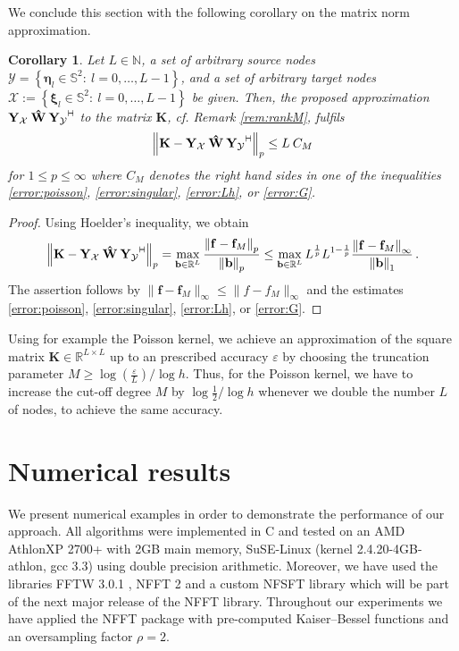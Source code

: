 \documentclass[11pt,a4paper,twoside,bibtotoc]{scrartcl}
\theoremstyle{plain}
\newtheorem{corollary}[theorem]{Corollary}
\theoremstyle{definition}
\theoremstyle{remark}
\newcommand{\N}{\ensuremath{\mathbb{N}}}
\newcommand{\R}{\ensuremath{\mathbb{R}}}
\newcommand{\adj}{{\vdash \hspace*{-1.72mm} \dashv}}
\numberwithin{equation}{section}
\numberwithin{table}{section}
\numberwithin{figure}{section}
\begin{document}
We conclude this section with the following corollary on the matrix norm
approximation.
\begin{corollary}
  \label{cor:rankapprox}
  Let $L \in \N$, a set of arbitrary source nodes $\mathcal{Y} =
  \left\{\mathbf{\eta}_{l} \in \mathbb{S}^2:\ l = 0,\ldots,L-1\right\}$, and a set of
  arbitrary target nodes $\mathcal{X} := \left\{\mathbf{\xi}_{l} \in
  \mathbb{S}^2:\ l=0,\ldots,L-1\right\}$ be given.
  Then, the proposed approximation $\mathbf{Y_{\mathcal{X}}} \: \mathbf{\hat W} \:
  \mathbf{Y_{\mathcal{Y}}}^{\adj}$ to the matrix $\mathbf{K}$, cf. Remark
  \ref{rem:rankM}, fulfils
  \begin{equation*}
    \left\| \mathbf{K} - \mathbf{Y_{\mathcal{X}}} \: \mathbf{\hat W} \:
      \mathbf{Y_{\mathcal{Y}}}^{\adj} \right\|_p
    \le L \: C_M
  \end{equation*}
  for $1\le p \le \infty$ where $C_M$ denotes the right hand sides in one of
  the inequalities \eqref{error:poisson}, \eqref{error:singular},
  \eqref{error:Lh}, or \eqref{error:G}. 
\end{corollary}
\begin{proof}
 Using Hoelder's inequality, we obtain
 \[
 \left\| \mathbf{K} - \mathbf{Y_{\mathcal{X}}} \: \mathbf{\hat W} \:
   \mathbf{Y_{\mathcal{Y}}}^{\adj} \right\|_p
 = \max_{\mathbf{b}\in \R^L} \frac{\left\|\mathbf{f} -
     \mathbf{f}_{M}\right\|_{p}}{\left\|\mathbf{b}\right\|_p}
 \le \max_{\mathbf{b}\in \R^L} L^{\frac{1}{p}} L^{1-\frac{1}{p}} \frac{\left\|\mathbf{f}
     - \mathbf{f}_{M}\right\|_{\infty}}{\left\|\mathbf{b}\right\|_1}\,.
 \]
 The assertion follows by $\|\mathbf{f} - \mathbf{f}_{M}\|_{\infty} \le
  \|f-f_M\|_{\infty}$ and the estimates
  \eqref{error:poisson}, \eqref{error:singular}, \eqref{error:Lh}, or
  \eqref{error:G}.
\end{proof}

Using for example the Poisson kernel, we achieve an approximation of the square matrix
$\mathbf{K}\in\R^{L \times L}$ up to an prescribed accuracy $\varepsilon$ by
choosing the truncation parameter $M\ge \log(\frac{\varepsilon}{L}) /\log h$.
Thus, for the Poisson kernel, we have to increase the cut-off degree $M$ by
$\log\frac{1}{2} / \log h$ whenever we double the number $L$ of nodes, to achieve
the same accuracy.

\section{Numerical results}
We present numerical examples in order to demonstrate the performance of
our approach. All algorithms were implemented in C and tested on an 
AMD Athlon\texttrademark XP 2700+ with 2GB main memory, SuSE-Linux 
(kernel 2.4.20-4GB-athlon, gcc 3.3) using double precision arithmetic. 
Moreover, we have used the libraries FFTW 3.0.1 \cite{fftw}, NFFT 2
\cite{kupo02C} and a custom NFSFT library which will be part of the next 
major release of the NFFT library. Throughout our experiments we have 
applied the NFFT package \cite{kupo02C} with pre-computed Kaiser--Bessel 
functions and an oversampling factor $\rho=2$.
\end{document}
